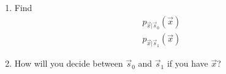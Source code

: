 \documentclass[journal,12pt,twocolumn]{IEEEtran}
\renewcommand\thesection{\arabic{section}}
\begin{document}
\begin{enumerate}[label=\thesection.\arabic*
,ref=\thesection.\theenumi]
%
where $\vec{s}\in \cbrak{\vec{s}_0,\vec{s}_1}$ and $\vec{n}\sim \mathcal{N}\brak{0,\sigma^2 \vec{I}}$, show 
that
\begin{align}
\mathbf{x}|0 = 
\begin{pmatrix*}
a + n_{1}\\
n_{2}
\end{pmatrix*},
\end{align}
and 
\begin{align}
\mathbf{x}|1 = 
\begin{pmatrix*}
n_{1}\\
a + n_{2}
\end{pmatrix*},
\end{align}
%
\item Find
\begin{align}
\label{eq:least_vecs}
p_{\vec{x}|\vec{s}_0}(\vec{x})
\\
p_{\vec{x}|\vec{s}_1}(\vec{x})
\end{align}
%
\item How will you decide between $\vec{s}_0$ and $\vec{s}_1$ if you have $\vec{x}$?
%
%
%
%
\end{enumerate}
%
%
\end{document}
